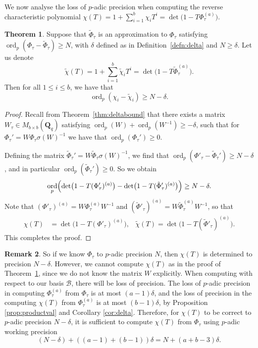 \documentclass[a4paper,11pt]{article}
\numberwithin{equation}{section}
\newcommand{\QQ}{\mathbf{Q}} %
\DeclareMathOperator{\ord}{ord}          %
\providecommand{\cB}{\mathcal{B}} %
\theoremstyle{definition}
\newtheorem{thm}{Theorem}[section]
\newtheorem{rem}[thm]{Remark}
\begin{document}
We now analyse the loss of $p$-adic precision when computing 
the reverse characteristic polynomial 
$\chi(T)=1+\sum_{i=1}^b \chi_i T^i=\det\bigl( 1 - T \Phi_{\tau}^{(a)}\bigr)$.

\begin{thm} \label{thm:preccharpoly}
Suppose that $\tilde{\Phi}_{\tau}$ is an approximation to 
$\Phi_{\tau}$ satisfying
$\ord_p (\Phi_{\tau}-\tilde{\Phi}_{\tau}) \geq N$,
with $\delta$ defined as in Definition~\ref{defn:delta} and $N \geq \delta$. 
Let us denote
\[
\tilde{\chi}(T) = 1 + \sum_{i=1}^b \tilde{\chi}_i T^i 
                = \det\bigl( 1 - T \tilde{\Phi}_{\tau}^{(a)}\bigr).
\]
Then for all $1 \leq i \leq b$, we have that 
\[
\ord_p (\chi_i - \tilde{\chi}_i) \geq N-\delta.
\]
\end{thm}

\begin{proof} 
Recall from Theorem~\ref{thm:deltabound} that there exists a matrix 
$W_{\tau} \in M_{b \times b}(\QQ_q)$ satisfying 
$\ord_p(W)+\ord_p(W^{-1}) \geq -\delta$, such that for 
$\Phi_{\tau}'=W \Phi_{\tau} \sigma(W)^{-1}$ 
we have that \mbox{$\ord_p(\Phi_{\tau}') \geq 0$}.

Defining the matrix 
$\tilde{\Phi}_{\tau}'=W \tilde{\Phi}_{\tau} \sigma(W)^{-1}$, we find that 
$\ord_p(\Phi'_{\tau}-\tilde{\Phi}_{\tau}') \geq N-\delta$, and in particular
$\ord_p(\tilde{\Phi}_{\tau}') \geq 0$. So we obtain
\[
\ord_p \Bigl( \det\bigl(1 - T (\Phi'_{\tau})^{(a)}\bigr) 
            - \det\bigl(1 - T (\tilde{\Phi}'_{\tau})^{(a)}\bigr) \Bigr) \geq N-\delta.
\] 
Note that $(\Phi'_{\tau})^{(a)}= W \Phi_{\tau}^{(a)} W^{-1}$
and $(\tilde{\Phi}'_{\tau})^{(a)}= W \tilde{\Phi}_{\tau}^{(a)} W^{-1}$, so that
\begin{align*}
\chi(T) &= \det\bigl(1 - T (\Phi'_{\tau})^{(a)}\bigr), \;\;\; 
\tilde{\chi}(T) = \det\bigl(1 - T (\tilde{\Phi}'_{\tau})^{(a)}\bigr).
\end{align*}
This completes the proof.
\end{proof}

\begin{rem} \label{rem:workprecchi}
So if we know $\Phi_{\tau}$ to $p$-adic precision $N$, then
$\chi(T)$ is determined to precision $N-\delta$.
However, we cannot compute $\chi(T)$ as in the proof of 
Theorem~\ref{thm:preccharpoly}, since we do not know the matrix 
$W$ explicitly. When computing with respect to our basis $\cB$,
there will be loss of precision. The loss of $p$-adic precision 
in computing $\Phi_{\tau}^{(a)}$ from $\Phi_{\tau}$ is at most 
$(a-1)\delta$, and the loss of 
precision in the computing $\chi(T)$ from $\Phi_{\tau}^{(a)}$ 
is at most $(b-1) \delta$, by Proposition \ref{prop:productval} and 
Corollary \ref{cor:delta}. Therefore, for $\chi(T)$ to be correct
to $p$-adic precision $N-\delta$, it is sufficient to compute 
$\chi(T)$ from $\Phi_{\tau}$ using $p$-adic working precision 
\[
(N-\delta)+((a-1)+(b-1))\delta=N+(a+b-3)\delta.
\] 
\end{rem}
\end{document}
